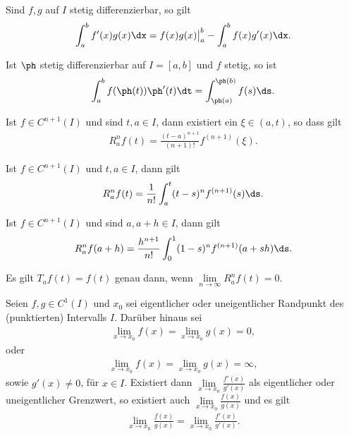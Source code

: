 \begin{prop}
Sind $f,g$ auf $I$ stetig differenzierbar, so gilt
\begin{align*}
\int_a^b f'(x)g(x)\dx = f(x)g(x)\big|_a^b - \int_a^b
f(x)g'(x)\dx.
\end{align*}
\end{prop}
\begin{prop}[Substitutionsregel]
Ist $\ph$ stetig differenzierbar auf $I = [a,b]$ und $f$ stetig, so ist
\begin{align*}
\int_a^b f(\ph(t))\ph'(t)\dt = \int_{\ph(a)}^{\ph(b)}
f(s)\ds.
\end{align*}
\end{prop}
\begin{prop}
Ist $f\in C^{n+1}(I)$ und sind $t,a\in I$, dann existiert ein
$\xi\in(a,t)$, so dass gilt
\begin{align*}
R_a^nf(t) = \frac{(t-a)^{n+1}}{(n+1)!}f^{(n+1)}(\xi).
\end{align*}
\end{prop}
\begin{prop}
Ist $f\in C^{n+1}(I)$ und $t,a\in I$, dann gilt 
\begin{align*}
R_a^nf(t) = \frac{1}{n!}\int_a^t(t-s)^nf^{(n+1)}(s)\ds.
\end{align*}
\end{prop}
\begin{prop}
Ist $f\in C^{n+1}(I)$ und sind $a,a+h\in I$, dann gilt 
\begin{align*}
R_a^nf(a+h) = \frac{h^{n+1}}{n!}\int_0^1(1-s)^nf^{(n+1)}(a+sh)\ds.
\end{align*}
\end{prop}
\begin{prop}
Es gilt $T_af(t) = f(t)$ genau dann, wenn
$\lim\limits_{n\to\infty}R_a^nf(t)=0$.
\end{prop}
\begin{prop}
Seien $f,g\in C^1(I)$ und $x_0$ sei eigentlicher oder uneigentlicher Randpunkt
des (punktierten) Intervalls $I$. Darüber hinaus sei
\begin{align*}
\lim\limits_{x\to x_0} f(x) = \lim\limits_{x\to x_0} g(x) = 0, 
\end{align*}
oder
\begin{align*}
\lim\limits_{x\to x_0} f(x) = \lim\limits_{x\to x_0} g(x) = \infty, 
\end{align*}
sowie $g'(x)\neq 0$, für $x\in I$. Existiert dann
$\lim\limits_{x\to x_0}\frac{f'(x)}{g'(x)}$ als eigentlicher oder
uneigentlicher Grenzwert, so existiert auch $\lim\limits_{x\to
x_0}\frac{f(x)}{g(x)}$ und es gilt
\begin{align*}
\lim\limits_{x\to x_0}\frac{f(x)}{g(x)} = \lim\limits_{x\to
x_0}\frac{f'(x)}{g'(x)}.
\end{align*}
\end{prop}
